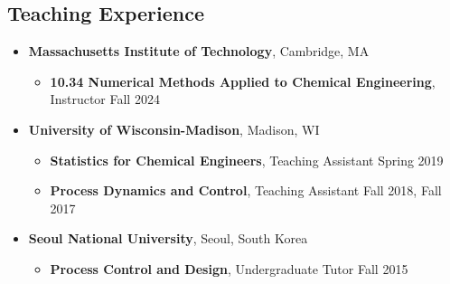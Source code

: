 \message{ !name(shin-abet.tex)}\documentclass[letterpaper, 11pt]{article}
\begin{document}
\subsection*{Teaching Experience}
\begin{itemize}[itemsep=1pt, parsep=0pt,leftmargin=*]
  \item[] \textbf{Massachusetts Institute of Technology}, Cambridge, MA
  \begin{itemize}[leftmargin=*,itemsep=0pt]
    \item[] \textbf{10.34 Numerical Methods Applied to Chemical Engineering}, Instructor \hfill Fall 2024
  \end{itemize}
\item[] \textbf{University of Wisconsin-Madison}, Madison, WI
  \begin{itemize}[leftmargin=*,itemsep=0pt]
  \item[] \textbf{Statistics for Chemical Engineers}, Teaching Assistant \hfill Spring 2019
  \item[] \textbf{Process Dynamics and Control}, Teaching Assistant \hfill  Fall 2018, Fall 2017
  \end{itemize}
\item[] \textbf{Seoul National University}, Seoul, South Korea
  \begin{itemize}[leftmargin=*,itemsep=0pt]
  \item[] \textbf{Process Control and Design}, Undergraduate Tutor \hfill  Fall 2015

\end{itemize}
\end{itemize}
\end{document}
